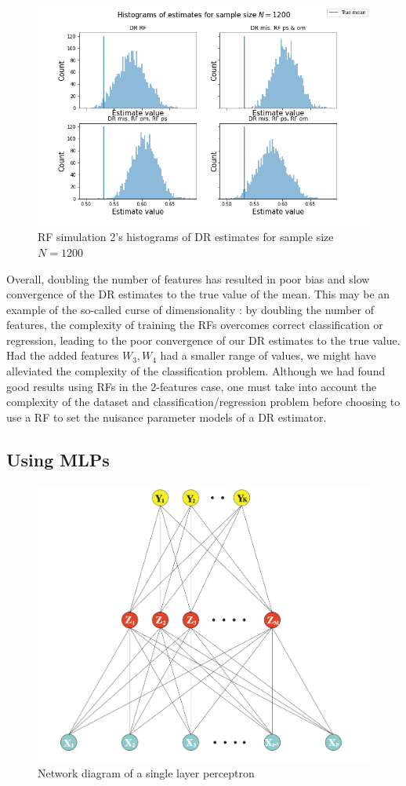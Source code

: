 \documentclass[12pt,twoside]{article}
\begin{document}
\begin{figure}[h!]
    \centering
    \includegraphics[width = 0.9\columnwidth]{figures/histRF_moreW.png}
    \caption{RF simulation 2's histograms of DR estimates for sample size $N = 1200$}
    \label{fighistRF_moreW}
\end{figure}

Overall, doubling the number of features has resulted in poor bias and slow convergence of the DR estimates to the true value of the mean. This may be an example of the so-called curse of dimensionality \citep{Wasserman2006}: by doubling the number of features, the complexity of training the RFs overcomes correct classification or regression, leading to the poor convergence of our DR estimates to the true value. Had the added features $W_3,W_4$ had a smaller range of values, we might have alleviated the complexity of the classification problem. Although we had found good results using RFs in the 2-features case, one must take into account the complexity of the dataset and classification/regression problem before choosing to use a RF to set the nuisance parameter models of a DR estimator.

\clearpage
\subsection{Using MLPs}
\begin{figure}[h!]
    \centering
    \includegraphics[width = 0.7\columnwidth]{figures/Screenshot 2021-05-26 at 19.21.43.png}
    \caption{Network diagram of a single layer perceptron \citep{hastieESL}}
    \label{fignn}
\end{figure}
\end{document}

